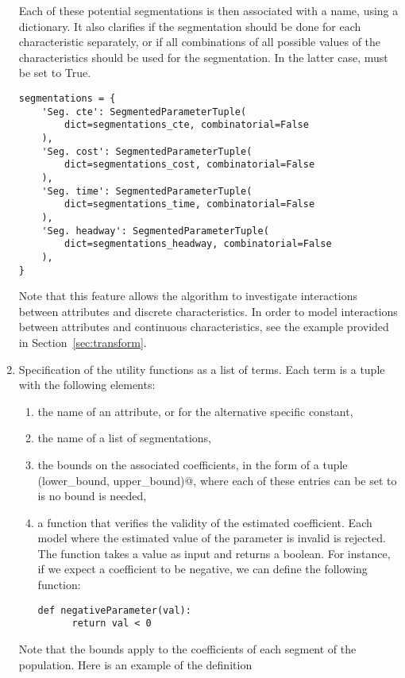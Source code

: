 \documentclass[12pt,a4paper]{article}
\begin{document}
\begin{enumerate}
  Each of these potential segmentations is then associated with a name,
  using a dictionary. It also clarifies if the segmentation should be
  done for each characteristic separately, or if all combinations of
  all possible values of the characteristics should be used for the
  segmentation. In the latter case, \lstinline@combinatorial@ must be
  set to True.
  \begin{lstlisting}
segmentations = {
    'Seg. cte': SegmentedParameterTuple(
        dict=segmentations_cte, combinatorial=False
    ),
    'Seg. cost': SegmentedParameterTuple(
        dict=segmentations_cost, combinatorial=False
    ),
    'Seg. time': SegmentedParameterTuple(
        dict=segmentations_time, combinatorial=False
    ),
    'Seg. headway': SegmentedParameterTuple(
        dict=segmentations_headway, combinatorial=False
    ),
}
  \end{lstlisting}
Note that this feature allows the algorithm to investigate interactions between
attributes and discrete characteristics. In order to model
interactions between attributes and continuous characteristics, see
the example provided in Section~\ref{sec:transform}.  
\item \label{item:util}Specification of the utility functions as a list of
  terms. Each term is a tuple with the following elements:
  \begin{enumerate}
  \item the name of an attribute, or \lstinline@None@ for the
    alternative specific constant,
  \item the name of a list of segmentations,
  \item the bounds on the associated coefficients, in the form of
    a tuple \lstinline@(lower_bound, upper_bound)@, where each of
    these entries can be set to \lstinline@None@ is no bound is
    needed,
  \item a function that verifies the validity of the estimated
    coefficient. Each model where the estimated value of the
    parameter is invalid is rejected. The function takes a value as input and returns
    a boolean. For instance, if we expect a coefficient to be
    negative, we can define the following function:
    \begin{lstlisting}
def negativeParameter(val):
      return val < 0
    \end{lstlisting}
  \end{enumerate}
  Note that the bounds apply to the coefficients of
  each segment of the population.  Here is an example of the definition

\end{enumerate}
\end{document}
